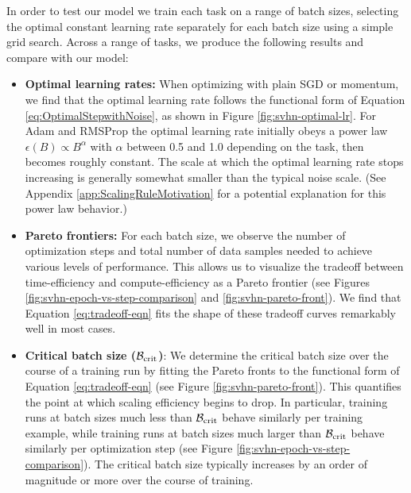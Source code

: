 \documentclass[english]{article}
\newcommand{\CB}{{\cal B}}
\begin{document}
In order to test our model we train each task on a range of batch sizes, selecting the optimal constant learning rate separately for each batch size using a simple grid search. Across a range of tasks, we produce the following results and compare with our model:
\begin{itemize}
\item \textbf{Optimal learning rates: }When optimizing with plain SGD or momentum, we find that the optimal learning rate follows the functional form of Equation \ref{eq:OptimalStepwithNoise}, as shown in Figure \ref{fig:svhn-optimal-lr}. For Adam and RMSProp the optimal learning rate initially obeys a power law $\epsilon\left(B\right)\propto B^{\alpha}$ with $\alpha$ between 0.5 and 1.0 depending on the task, then becomes roughly constant. The scale at which the optimal learning rate stops increasing is generally somewhat smaller than the typical noise scale. (See Appendix  \ref{app:ScalingRuleMotivation} for a potential explanation for this power law behavior.)
\item \textbf{Pareto frontiers:} For each batch size, we observe the number of optimization steps and total number of data samples needed to achieve various levels of performance. This allows us to visualize the tradeoff between time-efficiency and compute-efficiency as a Pareto frontier (see Figures \ref{fig:svhn-epoch-vs-step-comparison} and \ref{fig:svhn-pareto-front}). We find that Equation \ref{eq:tradeoff-eqn} fits the shape of these tradeoff curves remarkably well in most cases.
\item \textbf{Critical batch size ($\CB_{{\rm crit}}$)}: We determine the critical batch size over the course of a training run by fitting the Pareto fronts to the functional form of Equation \ref{eq:tradeoff-eqn} (see Figure \ref{fig:svhn-pareto-front}). This quantifies the point at which scaling efficiency begins to drop.  In particular, training runs at batch sizes much less than $\CB_{{\rm crit}}$ behave similarly per training example, while training runs at batch sizes much larger than $\CB_{{\rm crit}}$ behave similarly per optimization step (see Figure \ref{fig:svhn-epoch-vs-step-comparison}).  The critical batch size typically increases by an order of magnitude or more over the course of training.

\end{itemize}
\end{document}
